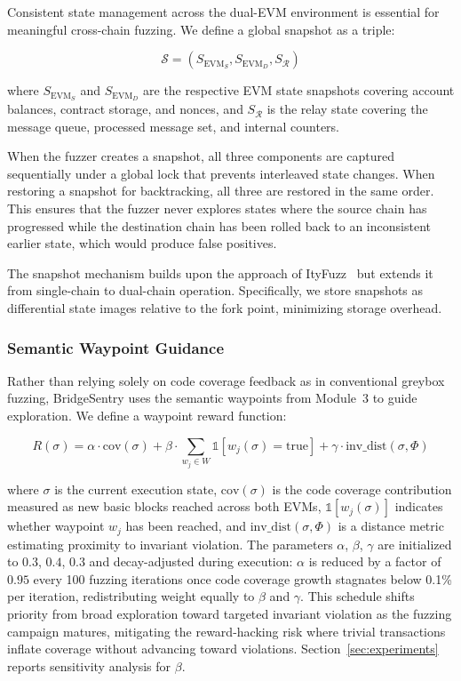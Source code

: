 \documentclass[journal]{IEEEtran}
\begin{document}
Consistent state management across the dual-EVM environment is essential for meaningful cross-chain fuzzing. We define a global snapshot as a triple:

\begin{equation}
    \mathcal{S} = (S_{\text{EVM}_S}, S_{\text{EVM}_D}, S_{\mathcal{R}})
\end{equation}

where $S_{\text{EVM}_S}$ and $S_{\text{EVM}_D}$ are the respective EVM state snapshots covering account balances, contract storage, and nonces, and $S_{\mathcal{R}}$ is the relay state covering the message queue, processed message set, and internal counters.

When the fuzzer creates a snapshot, all three components are captured sequentially under a global lock that prevents interleaved state changes. When restoring a snapshot for backtracking, all three are restored in the same order. This ensures that the fuzzer never explores states where the source chain has progressed while the destination chain has been rolled back to an inconsistent earlier state, which would produce false positives.

The snapshot mechanism builds upon the approach of ItyFuzz~\cite{shou2023ityfuzz} but extends it from single-chain to dual-chain operation. Specifically, we store snapshots as differential state images relative to the fork point, minimizing storage overhead.

\subsubsection{Semantic Waypoint Guidance}

Rather than relying solely on code coverage feedback as in conventional greybox fuzzing, BridgeSentry uses the semantic waypoints from Module~3 to guide exploration. We define a waypoint reward function:

\begin{equation}
    R(\sigma) = \alpha \cdot \text{cov}(\sigma) + \beta \cdot \sum_{w_j \in W} \mathbb{1}[w_j(\sigma) = \text{true}] + \gamma \cdot \text{inv\_dist}(\sigma, \Phi)
\end{equation}

where $\sigma$ is the current execution state, $\text{cov}(\sigma)$ is the code coverage contribution measured as new basic blocks reached across both EVMs, $\mathbb{1}[w_j(\sigma)]$ indicates whether waypoint $w_j$ has been reached, and $\text{inv\_dist}(\sigma, \Phi)$ is a distance metric estimating proximity to invariant violation. The parameters $\alpha$, $\beta$, $\gamma$ are initialized to $0.3$, $0.4$, $0.3$ and decay-adjusted during execution: $\alpha$ is reduced by a factor of $0.95$ every 100 fuzzing iterations once code coverage growth stagnates below 0.1\% per iteration, redistributing weight equally to $\beta$ and $\gamma$. This schedule shifts priority from broad exploration toward targeted invariant violation as the fuzzing campaign matures, mitigating the reward-hacking risk where trivial transactions inflate coverage without advancing toward violations. Section~\ref{sec:experiments} reports sensitivity analysis for $\beta$.
\end{document}
